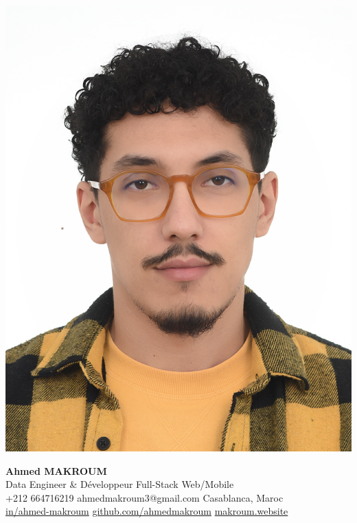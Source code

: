 \documentclass[10pt,a4paper,sans]{moderncv}
\begin{document}
\hspace*{0.03\textwidth}%
\begin{minipage}[c]{0.13\textwidth}
  \includegraphics[width=0.85\linewidth]{images/ahmed.jpg}
\end{minipage}%
\hfill
\begin{minipage}[c]{0.84\textwidth}
  \begin{center}
    {\fontsize{20}{22}\selectfont\textbf{Ahmed MAKROUM}}\\[0.7em]
    {\fontsize{13.2}{15.4}\selectfont Data Engineer \& Développeur Full-Stack Web/Mobile} \\[0.5em] %
    {\fontsize{10.5}{12.3}\selectfont
      \faMobile\enspace +212 664716219 \quad
      \faEnvelope\enspace ahmedmakroum3@gmail.com \quad
      \faHome\enspace Casablanca, Maroc \\
      \faLinkedin\enspace \href{https://www.linkedin.com/in/ahmed-makroum/}{in/ahmed-makroum} \quad
      \faGithub\enspace \href{https://github.com/ahmedmakroum}{github.com/ahmedmakroum}
      \faGlobe\enspace \href{https://makroum.website}{makroum.website}
    }\\[1em]
  \end{center}
\end{minipage}
\vspace{-14pt}
\end{document}
